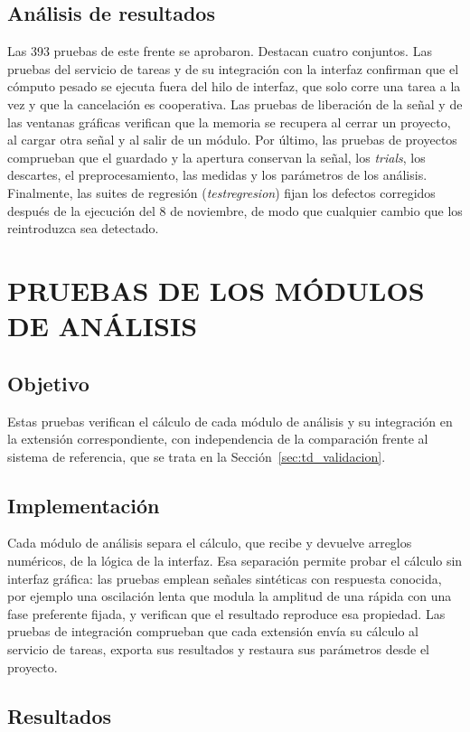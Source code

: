 \documentclass[12pt,letterpaper,oneside]{article}
\DeclareRobustCommand{\_}{\textunderscore\allowbreak}
\newcommand{\capitulo}[1]{\clearpage\section{#1}}
\begin{document}
\subsection{Análisis de resultados}
Las 393 pruebas de este frente se aprobaron. Destacan cuatro conjuntos. Las pruebas del servicio de tareas y de su integración con la interfaz confirman que el cómputo pesado se ejecuta fuera del hilo de interfaz, que solo corre una tarea a la vez y que la cancelación es cooperativa. Las pruebas de liberación de la señal y de las ventanas gráficas verifican que la memoria se recupera al cerrar un proyecto, al cargar otra señal y al salir de un módulo. Por último, las pruebas de proyectos comprueban que el guardado y la apertura conservan la señal, los \textit{trials}, los descartes, el preprocesamiento, las medidas y los parámetros de los análisis. Finalmente, las suites de regresión (\textit{test\_regresion\_*}) fijan los defectos corregidos después de la ejecución del 8 de noviembre, de modo que cualquier cambio que los reintroduzca sea detectado.
\capitulo{PRUEBAS DE LOS MÓDULOS DE ANÁLISIS}
\label{sec:td_modulos}

\subsection{Objetivo}
Estas pruebas verifican el cálculo de cada módulo de análisis y su integración en la extensión correspondiente, con independencia de la comparación frente al sistema de referencia, que se trata en la Sección~\ref{sec:td_validacion}.

\subsection{Implementación}
Cada módulo de análisis separa el cálculo, que recibe y devuelve arreglos numéricos, de la lógica de la interfaz. Esa separación permite probar el cálculo sin interfaz gráfica: las pruebas emplean señales sintéticas con respuesta conocida, por ejemplo una oscilación lenta que modula la amplitud de una rápida con una fase preferente fijada, y verifican que el resultado reproduce esa propiedad. Las pruebas de integración comprueban que cada extensión envía su cálculo al servicio de tareas, exporta sus resultados y restaura sus parámetros desde el proyecto.

\subsection{Resultados}
\end{document}
